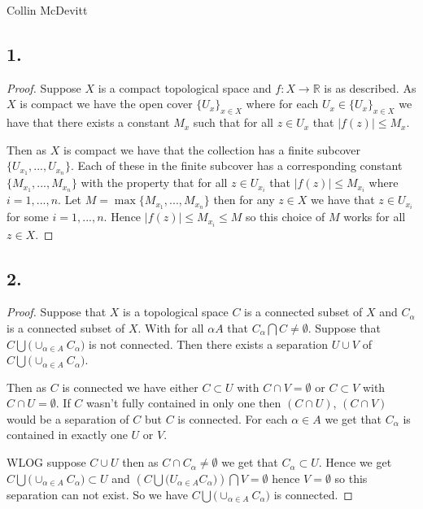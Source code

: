 \documentclass{amsart}
\theoremstyle{plain}
\theoremstyle{definition}
\theoremstyle{remark}
\begin{document}
Collin McDevitt 

\noindent
\subsection*{1.} 

\begin{proof}
    Suppose $X$ is a compact topological space and $f: X\to \mathbb R$ is as described. As $X$ is compact we have the open cover $\{U_x\}_{x\in X}$ where for each $U_x\in \{U_x\}_{x\in X}$ we have that there exists a constant $M_x$ such that for all $z\in U_x$ that $|f(z)|\leq M_x$. 
    
    Then as $X$ is compact we have that the collection has a finite subcover $\{U_{x_1},...,U_{x_n}\}$. Each of these in the finite subcover has a corresponding constant $\{M_{x_1},...,M_{x_n}\}$ with the property that for all $z\in U_{x_i}$ that $|f(z)|\leq M_{x_i}$ where $i=1,...,n$. Let $M=\max\{M_{x_1},...,M_{x_n}\}$ then for any $z\in X$ we have that $z\in U_{x_i}$ for some $i=1,...,n$. Hence $|f(z)|\leq M_{x_i}\leq M$ so this choice of $M$ works for all $z\in X$.
\end{proof}

\subsection*{2.}


\begin{proof}
    Suppose that $X$ is a topological space $C$ is a connected subset of $X$ and $C_{\alpha}$ is a connected subset of $X$. With for all $\alpha A$ that $C_\alpha \bigcap C\not = \emptyset$. Suppose that $C\bigcup \big ( \cup _{\alpha \in A} C_\alpha \big)$ is not connected. Then there exists a separation $U\cup V$ of $C\bigcup \big(\cup _{\alpha \in A} C_\alpha \big)$. 
    
    Then as $C$ is connected we have either $C\subset U$ with $C\cap V=\emptyset$ or $C\subset V$ with $C\cap U=\emptyset$. If $C$ wasn't fully contained in only one then $(C\cap U)$, $(C\cap V)$ would be a separation of $C$ but $C$ is connected. For each $\alpha \in A$ we get that $C_\alpha$ is contained in exactly one $U$ or $V$.
    
    WLOG suppose $C\cup U$ then as $C\cap C_\alpha \not = \emptyset $ we get that $C_\alpha \subset U$. Hence we get $C\bigcup \big(\cup _{\alpha \in A}C_\alpha \big)\subset U$ and $\left(C\bigcup \big(U_{\alpha\in A} C_\alpha \big)\right) \bigcap V=\emptyset$ hence $V=\emptyset$ so this separation can not exist. So we have $C\bigcup \big( \cup _{\alpha \in A}C_\alpha \big)$ is connected. 
\end{proof}
\end{document}
